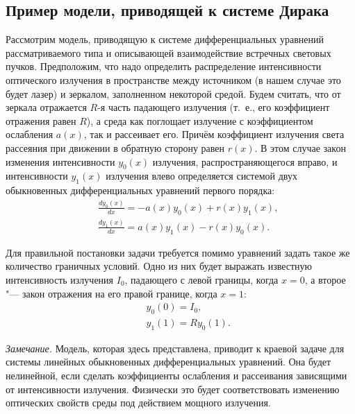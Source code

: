 \subsection{Пример модели, приводящей к системе Дирака }


Рассмотрим модель, приводящую к системе дифференциальных уравнений
рассматриваемого типа и описывающей  взаимодействие встречных
световых пучков. Предположим, что надо определить распределение
интенсивности оптического излучения в пространстве между источником
(в нашем случае это будет лазер) и
зеркалом, заполненном некоторой средой. %
Будем считать, что от зеркала отражается $R$-я часть падающего
излучения (т.~е., его коэффициент отражения равен $R$), а среда как
поглощает излучение с коэффициентом ослабления $a (x)$, так и
рассеивает его. Причём коэффициент излучения света рассеяния при
движении в обратную сторону равен $r (x)$. В этом случае закон
изменения интенсивности $y_{0} (x)$ излучения, распространяющегося
вправо, и интенсивности $y_{1} (x)$ излучения влево определяется
системой двух обыкновенных дифференциальных уравнений первого
порядка:
\begin{eqnarray} \label{eq00-1}
  & & { \frac{dy_{0} (x)}{dx} = -a(x) y_{0} (x) + r(x)
    y_{1}(x),}\\
   \nonumber
  & & {\frac{dy_{1} (x)}{dx} = a(x) y_{1} (x) - r(x)
y_{0}(x). }
\end{eqnarray}

Для правильной постановки задачи требуется помимо уравнений задать
такое же количество граничных условий. Одно из них будет выражать
известную интенсивность излучения $I_{0}$, падающего с левой
границы, когда $x=0$, а второе "--- закон отражения на его правой
границе, когда $x=1$:
\begin{eqnarray} \label{eq01-1}%
 & & { y_{0} (0) = I_{0},}\\
 \nonumber
 & & { y_{1} (1) = R y_{0} (1). }
\end{eqnarray}





\textit{Замечание.} Модель, которая здесь представлена, %
приводит к краевой задаче для системы линейных обыкновенных
дифференциальных уравнений. Она будет нелинейной, если сделать
коэффициенты ослабления и рассеивания зависящими от интенсивности
излучения. Физически это будет соответствовать изменению оптических
свойств среды под действием мощного излучения.

